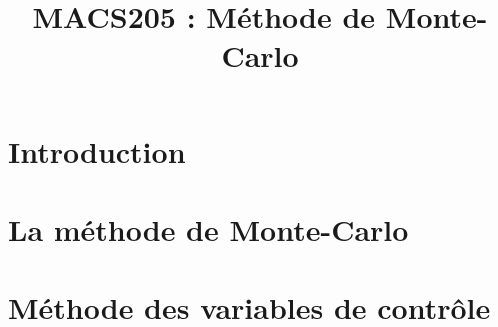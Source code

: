 \documentclass[a4paper,9pt]{article}
\title{\vspace{-1.2cm} \textbf{MACS205 : Méthode de Monte-Carlo}}
\begin{document}
\maketitle

\vspace{-1.5cm}


\section{Introduction}
	

\section{La méthode de Monte-Carlo}
	

\section{Méthode des variables de contrôle}
	
\end{document}
